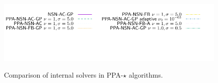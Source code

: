 \documentclass[a4paper]{article}
\begin{document}
\begin{figure}
{\includegraphics[height=\legendheight]{../figure/PROX/NSN/InternalSolvers/1.0e-08/50/time/profile-Chain_legend.pdf}}
   \caption{Comparison of internal solvers in {\sf PPA-$\star$} algorithms.}
  \label{fig:PROX/InternalSolvers}
\end{figure}  







\begin{figure}
  \centering
  \subfiglayout

\end{figure}
\end{document}
